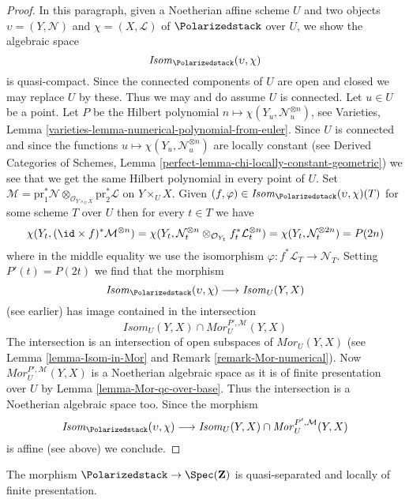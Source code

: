 \begin{proof}
\medskip\noindent
In this paragraph, given a Noetherian affine scheme $U$ and two objects
$\upsilon = (Y, \mathcal{N})$ and $\chi = (X, \mathcal{L})$
of $\Polarizedstack$ over $U$, we show the algebraic space
$$
\mathit{Isom}_{\Polarizedstack}(\upsilon, \chi)
$$
is quasi-compact. Since the connected components of $U$ are open and closed
we may replace $U$ by these. Thus we may and do assume $U$ is connected.
Let $u \in U$ be a point. Let $P$ be the Hilbert polynomial
$n \mapsto \chi(Y_u, \mathcal{N}_u^{\otimes n})$, see
Varieties, Lemma \ref{varieties-lemma-numerical-polynomial-from-euler}.
Since $U$ is connected and since
the functions $u \mapsto \chi(Y_u, \mathcal{N}_u^{\otimes n})$
are locally constant (see 
Derived Categories of Schemes, Lemma
\ref{perfect-lemma-chi-locally-constant-geometric})
we see that we get the same Hilbert polynomial in every point of $U$.
Set
$\mathcal{M} = \text{pr}_1^*\mathcal{N}
\otimes_{\mathcal{O}_{Y \times_U X}} \text{pr}_2^*\mathcal{L}$
on $Y \times_U X$. Given
$(f, \varphi) \in \mathit{Isom}_{\Polarizedstack}(\upsilon, \chi)(T)$
for some scheme $T$ over $U$ then for every $t \in T$ we have
$$
\chi(Y_t, (\id \times f)^*\mathcal{M}^{\otimes n}) =
\chi(Y_t,
\mathcal{N}_t^{\otimes n} \otimes_{\mathcal{O}_{Y_t}}
f_t^*\mathcal{L}_t^{\otimes n}) =
\chi(Y_t, \mathcal{N}_t^{\otimes 2n}) = P(2n)
$$
where in the middle equality we use the isomorphism
$\varphi : f^*\mathcal{L}_T \to \mathcal{N}_T$.
Setting $P'(t) = P(2t)$ we find that the morphism
$$
\mathit{Isom}_{\Polarizedstack}(\upsilon, \chi)
\longrightarrow
\mathit{Isom}_U(Y, X)
$$
(see earlier) has image contained in the intersection
$$
\mathit{Isom}_U(Y, X) \cap \mathit{Mor}^{P', \mathcal{M}}_U(Y, X)
$$
The intersection is an intersection of open subspaces of
$\mathit{Mor}_U(Y, X)$ (see Lemma \ref{lemma-Isom-in-Mor} and
Remark \ref{remark-Mor-numerical}).
Now $\mathit{Mor}^{P', \mathcal{M}}_U(Y, X)$
is a Noetherian algebraic space as it is of finite
presentation over $U$ by Lemma \ref{lemma-Mor-qc-over-base}.
Thus the intersection
is a Noetherian algebraic space too. Since the morphism
$$
\mathit{Isom}_{\Polarizedstack}(\upsilon, \chi)
\longrightarrow
\mathit{Isom}_U(Y, X) \cap \mathit{Mor}^{P', \mathcal{M}}_U(Y, X)
$$
is affine (see above) we conclude.
\end{proof}

\begin{lemma}
\label{lemma-polarized-qs-lfp}
The morphism $\Polarizedstack \to \Spec(\mathbf{Z})$ is quasi-separated and
locally of finite presentation.
\end{lemma}

